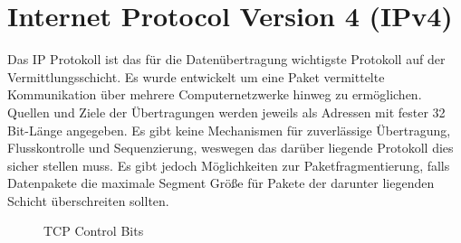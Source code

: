 \section{Internet Protocol Version 4 (IPv4)}
Das IP Protokoll ist das für die Datenübertragung wichtigste Protokoll auf der Vermittlungsschicht. Es wurde entwickelt um eine Paket vermittelte Kommunikation über mehrere Computernetzwerke hinweg zu ermöglichen. Quellen und Ziele der Übertragungen werden jeweils als Adressen mit fester 32 Bit-Länge angegeben. Es gibt keine Mechanismen für zuverlässige Übertragung, Flusskontrolle und Sequenzierung, weswegen das darüber liegende Protokoll dies sicher stellen muss. Es gibt jedoch Möglichkeiten zur Paketfragmentierung, falls Datenpakete die maximale Segment Größe für Pakete der darunter liegenden Schicht überschreiten sollten.

\begin{figure}[h]
\centering
{}
\caption{TCP Control Bits}
\label{fig_ControlBits}
\end{figure}

